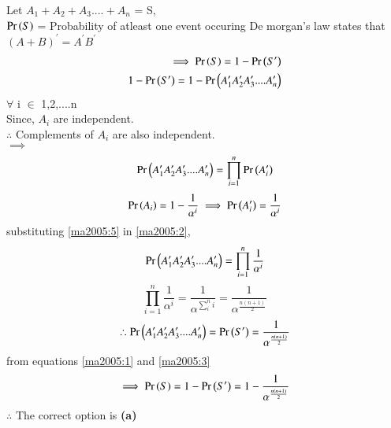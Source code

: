 Let $A_{1} + A_{2} + A_{3} .... + A_{n}$ = S, \\
$\Pr\left(S\right)$ = Probability of atleast one event occuring
De morgan's law states that $(A + B)^\prime = A^\prime B^\prime$  
\begin{align}
    \label{1.1}
   \implies \Pr\left(S\right) = 1 - \Pr\left(S^\prime\right) \\ 
   1 - \Pr\left(S^\prime\right)= 1 - \Pr\left(A_{1}^\prime A_{2}^\prime A_{3}^\prime
   ....A_{n}^\prime\right)
   \label{ma2005:1}
\end{align}
$\forall$ i $\in$ {1,2,....n} \\
Since, $A_{i}$ are independent.\\
$\therefore$ Complements of $A_{i}$ are also independent.\\
$\implies$ 
\begin{equation}
\Pr\left(A_{1}^\prime A_{2}^\prime A_{3}^\prime
   ....A_{n}^\prime\right)=\prod_{i=1}^{n}\Pr\left(A_{i}^\prime\right)
   \label{ma2005:2}
\end{equation}
\begin{equation}
\Pr\left(A_{i}\right) = 1 - \frac{1}{\alpha^i} \implies \Pr\left(A_{i}^\prime\right) = \frac{1}{\alpha^i} \label{ma2005:5}
\end{equation}
substituting \eqref{ma2005:5} in \eqref{ma2005:2},
\begin{equation}
    \label{2.3}
  \Pr\left(A_{1}^\prime A_{2}^\prime A_{3}^\prime ....A_{n}^\prime\right) =  \prod_{i=1}^{n}\frac{1}{\alpha^i} \\
\end{equation}
\begin{equation}
\label{2.4}
   \prod_{i=1}^{n}\frac{1}{\alpha^i}=\frac{1}{\alpha^{\sum_{i}^{n}i}}= \frac{1}{\alpha^\frac{n(n+1)}{2}} 
\end{equation}
\begin{equation}
    \therefore \Pr\left(A_{1}^\prime A_{2}^\prime A_{3}^\prime ....A_{n}^\prime\right) = \Pr\left(S^\prime\right) = \frac{1}{\alpha^\frac{n(n+1)}{2}} \label{ma2005:3}
\end{equation}
from equations \eqref{ma2005:1} and \eqref{ma2005:3} 
\begin{equation}
\label{2.6}
\implies \Pr\left(S\right) = 1 - \Pr\left(S^\prime\right) = 1 - \frac{1}{\alpha^\frac{n(n+1)}{2}}
\end{equation}
$\therefore$ The correct option is \textbf{(a)}